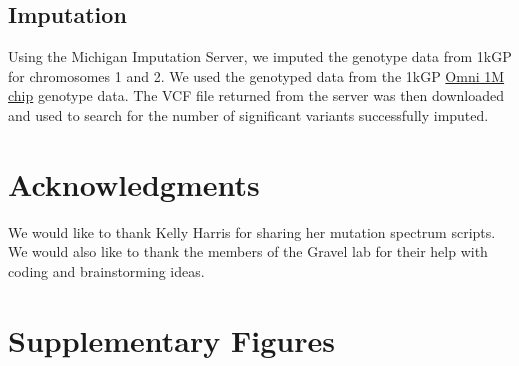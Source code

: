 \documentclass[9pt,lineno]{elife}
\begin{document}
\subsection{Imputation}
Using the Michigan Imputation Server, we imputed the genotype data from 1kGP for chromosomes 1 and 2.
We used the genotyped data from the 1kGP \href{ftp://ftp.1000genomes.ebi.ac.uk/vol1/ftp/release/20130502/supporting/hd_genotype_chip/ALL.chip.omni_broad_sanger_combined.20140818.snps.genotypes.vcf.gz}{Omni 1M chip} genotype data.
The VCF file returned from the server was then downloaded and used to search for the number of significant variants successfully imputed. 

\section{Acknowledgments}
We would like to thank Kelly Harris for sharing her mutation spectrum scripts.
We would also like to thank the members of the Gravel lab for their help with coding and brainstorming ideas.



\clearpage
\section{Supplementary Figures}
\renewcommand{\thefigure}{S\arabic{figure}}
\setcounter{figure}{0}   	
\end{document}
